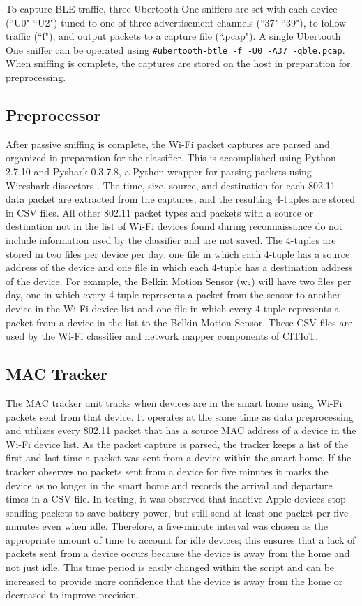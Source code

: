\documentclass[journal]{./IEEEtran/IEEEtran}
\begin{document}
To capture \ac{BLE} traffic, three Ubertooth One sniffers are set with each device (``U0"-``U2") tuned to one of three advertisement channels (``37"-``39"), to follow traffic (``f"), and output packets to a capture file (``.pcap"). A single Ubertooth One sniffer can be operated using \texttt{\#ubertooth-btle -f -U0 -A37 -qble.pcap}. When sniffing is complete, the captures are stored on the host in preparation for preprocessing.

\subsection{Preprocessor}
After passive sniffing is complete, the Wi-Fi packet captures are parsed and organized in preparation for the classifier. This is accomplished using Python 2.7.10 and Pyshark 0.3.7.8, a Python wrapper for parsing packets using Wireshark dissectors \cite{Pyshark}. The time, size, source, and destination for each 802.11 data packet are extracted from the captures, and the resulting 4-tuples are stored in \ac{CSV} files. All other 802.11 packet types and packets with a source or destination not in the list of Wi-Fi devices found during reconnaissance do not include information used by the classifier and are not saved. The 4-tuples are stored in two files per device per day: one file in which each 4-tuple has a source address of the device and one file in which each 4-tuple has a destination address of the device. For example, the Belkin Motion Sensor (w$ _{8}$) will have two files per day, one in which every 4-tuple represents a packet from the sensor to another device in the Wi-Fi device list and one file in which every 4-tuple represents a packet from a device in the list to the Belkin Motion Sensor. These \ac{CSV} files are used by the Wi-Fi classifier and network mapper components of \ac{CITIoT}.

\subsection{\ac{MAC} Tracker}

The \ac{MAC} tracker unit tracks when devices are in the smart home using Wi-Fi packets sent from that device. It operates at the same time as data preprocessing and utilizes every 802.11 packet that has a source \ac{MAC} address of a device in the Wi-Fi device list. As the packet capture is parsed, the tracker keeps a list of the first and last time a packet was sent from a device within the smart home. If the tracker observes no packets sent from a device for five minutes it marks the device as no longer in the smart home and records the arrival and departure times in a \ac{CSV} file. In testing, it was observed that inactive Apple devices stop sending packets to save battery power, but still send at least one packet per five minutes even when idle. Therefore, a five-minute interval was chosen as the appropriate amount of time to account for idle devices; this ensures that a lack of packets sent from a device occurs because the device is away from the home and not just idle. This time period is easily changed within the script and can be increased to provide more confidence that the device is away from the home or decreased to improve precision.
\end{document}
